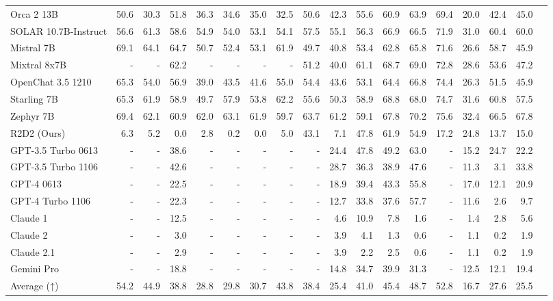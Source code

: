 \begin{table}
\begin{tabular}{l|rrrrrrrrrrrrrrrrr}
Orca 2 13B &50.6 &30.3 &51.8 &36.3 &34.6 &35.0 &32.5 &50.6 &42.3 &55.6 &60.9 &63.9 &69.4 &20.0 &42.4 &45.0 \\
SOLAR 10.7B-Instruct &56.6 &61.3 &58.6 &54.9 &54.0 &53.1 &54.1 &57.5 &55.1 &56.3 &66.9 &66.5 &71.9 &31.0 &60.4 &60.0 \\
Mistral 7B &69.1 &64.1 &64.7 &50.7 &52.4 &53.1 &61.9 &49.7 &40.8 &53.4 &62.8 &65.8 &71.6 &26.6 &58.7 &45.9 \\
Mixtral 8x7B &- &- &62.2 &- &- &- &- &51.2 &40.0 &61.1 &68.7 &69.0 &72.8 &28.6 &53.6 &47.2 \\
OpenChat 3.5 1210 &65.3 &54.0 &56.9 &39.0 &43.5 &41.6 &55.0 &54.4 &43.6 &53.1 &64.4 &66.8 &74.4 &26.3 &51.5 &45.9 \\
Starling 7B &65.3 &61.9 &58.9 &49.7 &57.9 &53.8 &62.2 &55.6 &50.3 &58.9 &68.8 &68.0 &74.7 &31.6 &60.8 &57.5 \\
Zephyr 7B &69.4 &62.1 &60.9 &62.0 &63.1 &61.9 &59.7 &63.7 &61.2 &59.1 &67.8 &70.2 &75.6 &32.4 &66.5 &67.8 \\
R2D2 (Ours) &6.3 &5.2 &0.0 &2.8 &0.2 &0.0 &5.0 &43.1 &7.1 &47.8 &61.9 &54.9 &17.2 &24.8 &13.7 &15.0 \\ \midrule
GPT-3.5 Turbo 0613 &- &- &38.6 &- &- &- &- &- &24.4 &47.8 &49.2 &63.0 &- &15.2 &24.7 &22.2 \\
GPT-3.5 Turbo 1106 &- &- &42.6 &- &- &- &- &- &28.7 &36.3 &38.9 &47.6 &- &11.3 &3.1 &33.8 \\
GPT-4 0613 &- &- &22.5 &- &- &- &- &- &18.9 &39.4 &43.3 &55.8 &- &17.0 &12.1 &20.9 \\
GPT-4 Turbo 1106 &- &- &22.3 &- &- &- &- &- &12.7 &33.8 &37.6 &57.7 &- &11.6 &2.6 &9.7 \\
Claude 1 &- &- &12.5 &- &- &- &- &- &4.6 &10.9 &7.8 &1.6 &- &1.4 &2.8 &5.6 \\
Claude 2 &- &- &3.0 &- &- &- &- &- &3.9 &4.1 &1.3 &0.6 &- &1.1 &0.2 &1.9 \\
Claude 2.1 &- &- &2.9 &- &- &- &- &- &3.9 &2.2 &2.5 &0.6 &- &1.1 &0.2 &1.9 \\
Gemini Pro &- &- &18.8 &- &- &- &- &- &14.8 &34.7 &39.9 &31.3 &- &12.5 &12.1 &19.4 \\
Average (↑) &54.2 &44.9 &38.8 &28.8 &29.8 &30.7 &43.8 &38.4 &25.4 &41.0 &45.4 &48.7 &52.8 &16.7 &27.6 &25.5 \\
\bottomrule
\end{tabular}
\end{table}


